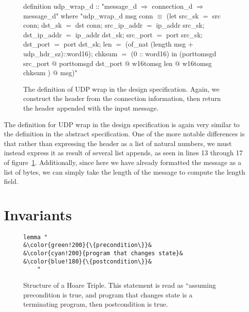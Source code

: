 \documentclass[twoside]{memoir}
\begin{document}
\begin{figure}[htpb]
    \centering
\begin{nlisting}[language=isabelle]
definition udp_wrap_d :: "message_d $\Rightarrow$ connection_d $\Rightarrow$ message_d"
where "udp_wrap_d msg conn $\equiv$ (let
                            src_sk $=$ src conn;
                            dst_sk $=$ dst conn;
                            src_ip_addr $=$ ip_addr src_sk;
                            dst_ip_addr $=$ ip_addr dst_sk;
                            src_port $=$ port src_sk;
                            dst_port $=$ port dst_sk;
                            len $=$ (of_nat
                        (length msg $+$ udp_hdr_sz)::word16);
                            chksum $=$ (0 :: word16)
                          in
                            (porttomsgd src_port $@$
                             porttomsgd dst_port $@$
                             w16tomsg len $@$
                             w16tomsg chksum
                            ) $@$ msg)"
\end{nlisting}
    \caption{The definition of UDP wrap in the design specification.
        Again, we construct the header from the connection information,
        then return the header appended with the input message.
    }
    \label{fig:wrap-design}
\end{figure}

The definition for UDP wrap in the design specification is
again very similar to the definition in the abstract specification.
One of the more notable differences is 
that rather than expressing the header as a list of natural numbers,
we must instead express it as result of several list appends,
as seen in lines 13 through 17 of figure~\ref{fig:wrap-design}.
Additionally, since here we have already formatted the message as
a list of bytes, we can simply take the length of the message
to compute the length field.






\section{Invariants}

\begin{figure}[htpb]
    \centering
\begin{lstlisting}[language=isabelle]
lemma "
&\color{green!200}{\{precondition\}}&
&\color{cyan!200}{program that changes state}&
&\color{blue!180}{\{postcondition\}}&
    "
\end{lstlisting}
    
    \caption{Structure of a Hoare Triple.
        This statement is read as
        ``assuming {\color{green!200}precondition} is true,
        and {\color{cyan!200}program that changes state} is a terminating
        program, then {\color{blue!180}postcondition} is true.
        }
    \label{fig:hoare-triple-structure}
\end{figure}
\end{document}
